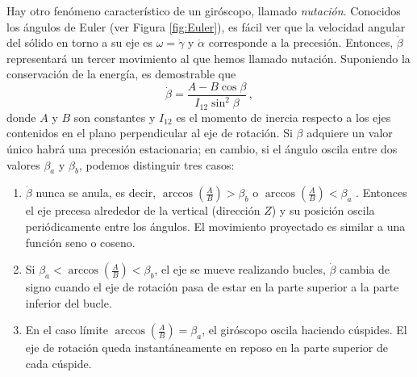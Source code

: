 \documentclass[a4paper]{article}
\begin{document}
Hay otro fenómeno característico de un giróscopo, llamado \textit{nutación}. Conocidos los ángulos de Euler (ver Figura \ref{fig:Euler}), es fácil ver que la velocidad angular del sólido en torno a su eje es $\omega=\dot{\gamma}$ y $\dot{\alpha}$ corresponde a la precesión. Entonces, $\dot{\beta}$ representará un tercer movimiento al que hemos llamado nutación. Suponiendo la conservación de la energía, es demostrable que 
\begin{equation}
\label{nutacion}
\dot{\beta}=\frac{A-B\cos\beta}{I_{12}\sin^2\beta}\, ,
\end{equation}
donde $A$ y $B$ son constantes y $I_{12}$ es el momento de inercia respecto a los ejes contenidos en el plano perpendicular al eje de rotación. Si $\beta$ adquiere un valor único habrá una precesión estacionaria; en cambio, si el ángulo oscila entre dos valores $\beta_a$ y $\beta_b$, podemos distinguir tres casos:
\begin{enumerate}
\item $\dot{\beta}$ nunca se anula, es decir, $\arccos\left(\frac{A}{B}\right)>\beta_b$ o $\arccos\left(\frac{A}{B}\right)<\beta_a$ . Entonces el eje precesa alrededor de la vertical (dirección $Z$) y su posición oscila periódicamente entre los ángulos. El movimiento proyectado es similar a una función seno o coseno.
\item Si $\beta_a<\arccos\left(\frac{A}{B}\right)<\beta_b$, el eje se mueve realizando bucles, $\dot{\beta}$ cambia de signo cuando el eje de rotación pasa de estar en la parte superior a la parte inferior del bucle.
\item En el caso límite $\arccos\left(\frac{A}{B}\right)=\beta_a$, el giróscopo oscila haciendo cúspides. El eje de rotación queda instantáneamente en reposo en la parte superior de cada cúspide.
\end{enumerate}
\end{document}
